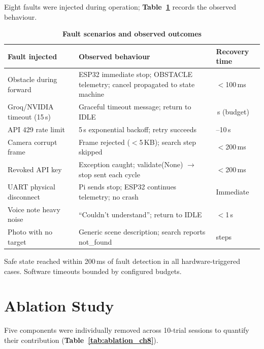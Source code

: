 Eight faults were injected during operation; \textbf{Table~\ref{tab:faults_ch8}} records the observed behaviour.

\begin{table}[H]
\centering
\caption[Fault scenarios and observed outcomes]{\textbf{Fault scenarios and observed outcomes}}
\label{tab:faults_ch8}
\begin{tabularx}{\textwidth}{|>{\raggedright\arraybackslash}p{3.5cm}|X|>{\raggedright\arraybackslash}p{2.2cm}|}
\hline
\textbf{Fault injected} & \textbf{Observed behaviour} & \textbf{Recovery time} \\
\hline
Obstacle during forward & ESP32 immediate stop; OBSTACLE telemetry; cancel propagated to state machine & $<$100\,ms \\
\hline
Groq/NVIDIA timeout (15\,s) & Graceful timeout message; return to IDLE & 15\,s (budget) \\
\hline
API 429 rate limit & 5\,s exponential backoff; retry succeeds & 5--10\,s \\
\hline
Camera corrupt frame & Frame rejected ($<$5\,KB); search step skipped & $<$200\,ms \\
\hline
Revoked API key & Exception caught; validate(None) $\to$ stop sent each cycle & $<$200\,ms \\
\hline
UART physical disconnect & Pi sends stop; ESP32 continues telemetry; no crash & Immediate \\
\hline
Voice note heavy noise & ``Couldn't understand''; return to IDLE & $<$1\,s \\
\hline
Photo with no target & Generic scene description; search reports not\_found & 20 steps \\
\hline
\end{tabularx}
\end{table}

Safe state reached within 200\,ms of fault detection in all hardware-triggered cases. Software timeouts bounded by configured budgets.

\section{Ablation Study}
\label{sec:ablation}

Five components were individually removed across 10-trial sessions to quantify their contribution (\textbf{Table~\ref{tab:ablation_ch8}}).


